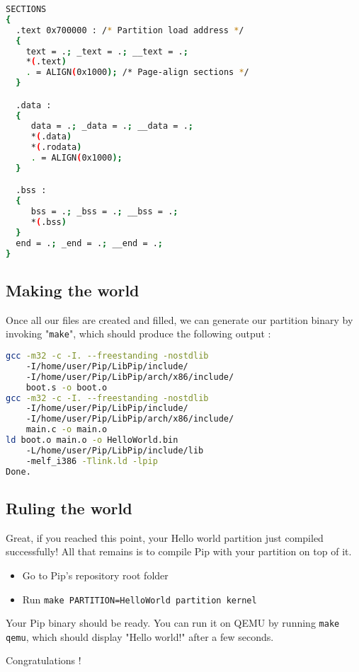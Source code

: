 \documentclass[10pt,a4paper,titlepage]{refart}
\begin{document}
\begin{lstlisting}[language=bash,caption={link.ld sections}]
SECTIONS
{
  .text 0x700000 : /* Partition load address */
  {
    text = .; _text = .; __text = .;
    *(.text)
    . = ALIGN(0x1000); /* Page-align sections */
  }

  .data :
  {
     data = .; _data = .; __data = .;
     *(.data)
     *(.rodata)
     . = ALIGN(0x1000);
  }

  .bss :
  {
     bss = .; _bss = .; __bss = .;
     *(.bss)
  }
  end = .; _end = .; __end = .;
}
\end{lstlisting}

\subsection{Making the world}
Once all our files are created and filled, we can generate our partition binary by invoking "\texttt{make}", which should produce the following output :
\begin{lstlisting}[language=bash,caption={Partition make output}]
gcc -m32 -c -I. --freestanding -nostdlib 
	-I/home/user/Pip/LibPip/include/ 
	-I/home/user/Pip/LibPip/arch/x86/include/
	boot.s -o boot.o
gcc -m32 -c -I. --freestanding -nostdlib
	-I/home/user/Pip/LibPip/include/
	-I/home/user/Pip/LibPip/arch/x86/include/ 
	main.c -o main.o
ld boot.o main.o -o HelloWorld.bin 
	-L/home/user/Pip/LibPip/include/lib
	-melf_i386 -Tlink.ld -lpip
Done.
\end{lstlisting}

\subsection{Ruling the world}
Great, if you reached this point, your Hello world partition just compiled successfully! All that remains is to compile Pip with your partition on top of it.
\begin{itemize}
\item Go to Pip's repository root folder
\item Run \texttt{make PARTITION=HelloWorld partition kernel}
\end{itemize}

Your Pip binary should be ready. You can run it on QEMU by running \texttt{make qemu}, which should display "Hello world!" after a few seconds. 

Congratulations !
\end{document}
